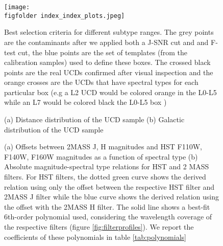 \begin{sidewaysfigure}
    \centering
    \texttt{[image: \\figfolder index\_index\_plots.jpeg]}
    \caption{Best selection criteria for different subtype ranges. The grey points are the contaminants after we applied both a J-SNR cut and and F-test cut, the blue points are the set of templates (from the calibration samples) used to define these boxes. The crossed black points are the real UCDs confirmed after visual inspection and the orange crosses are the UCDs that have spectral types for each particular box (e.g a L2 UCD would be colored orange in the L0-L5 while an L7 would be colored black the L0-L5 box )}
    \label{fig:indexplots}
\end{sidewaysfigure}





\begin{figure}
    \centering
    \caption{ (a) Distance distribution of the UCD sample
    (b) Galactic distribution of the UCD sample}
    \label{fig:candidedistances}
\end{figure}

\begin{figure}
    \centering
    \caption{ (a) Offsets between 2MASS J, H magnitudes and HST F110W, F140W, F160W magnitudes as a function of spectral type (b) Absolute  magnitude-spectral type relations for HST and 2 MASS filters. For HST filters, the dotted green curve shows the derived relation using only the offset between the respective HST filter and 2MASS J filter while the blue curve shows the derived relation using the offset with the 2MASS H filter. The solid line shows a best-fit 6th-order polynomial used, considering the wavelength coverage of the respective filters (figure \ref{fig:filterprofiles}). We report the coefficients of these polynomials in table \ref{tab:polynomials}}
    \label{fig:absmagrelations}
\end{figure}



